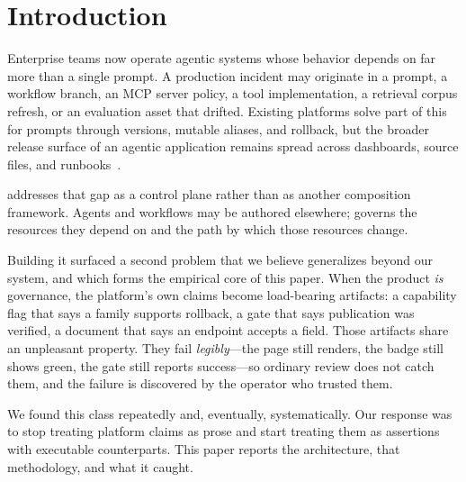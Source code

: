 \documentclass{article}
\begin{document}
\printAffiliationsAndNotice{}

\section{Introduction}

Enterprise teams now operate agentic systems whose behavior depends on far more
than a single prompt. A production incident may originate in a prompt, a workflow
branch, an MCP server policy, a tool implementation, a retrieval corpus refresh, or
an evaluation asset that drifted. Existing platforms solve part of this for prompts
through versions, mutable aliases, and rollback, but the broader release surface of
an agentic application remains spread across dashboards, source files, and
runbooks~\cite{mlflowpromptregistry,langsmithprompts,langfuseprompts}.

\sys addresses that gap as a control plane rather than as another composition
framework. Agents and workflows may be authored elsewhere; \sys governs the
resources they depend on and the path by which those resources change.

Building it surfaced a second problem that we believe generalizes beyond our
system, and which forms the empirical core of this paper. When the product
\emph{is} governance, the platform's own claims become load-bearing artifacts: a
capability flag that says a family supports rollback, a gate that says publication
was verified, a document that says an endpoint accepts a field. Those artifacts
share an unpleasant property. They fail \emph{legibly}---the page still renders,
the badge still shows green, the gate still reports success---so ordinary review
does not catch them, and the failure is discovered by the operator who trusted
them.

We found this class repeatedly and, eventually, systematically. Our response was to
stop treating platform claims as prose and start treating them as assertions with
executable counterparts. This paper reports the architecture, that methodology, and
what it caught.
\end{document}

